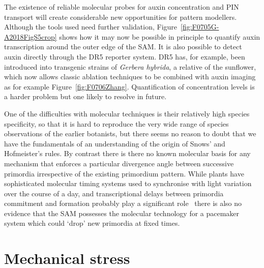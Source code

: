 The existence of reliable molecular probes for auxin concentration and PIN transport will create considerable new opportunities for pattern modellers. Although the tools used need further validation,  Figure~\ref{fig:F0705G-A2018FigS5crop} shows how it may now be possible in principle to quantify auxin transcription around the outer edge of the SAM. 
%
%
%
It is also possible to detect auxin directly through the DR5 reporter system.
 DR5  has, for example, been introduced into transgenic strains of \textit{Gerbera hybrida}, a  relative of the sunflower, which now allows  classic ablation techniques  to be combined with auxin imaging as for example Figure~\ref{fig:F0706Zhang}.
Quantification of concentration levels is a harder problem but one likely to resolve in future. %


One of the difficulties with molecular techniques is their relatively high species specificity, so that it is hard to reproduce the very wide range of species observations of the earlier botanists, but there seems no reason to doubt that we have the fundamentals of an understanding of the origin of Snows' and Hofmeister's rules. By contrast there is there no known molecular basis  for any mechanism that enforces a particular divergence angle between successive primordia irrespective of the existing primordium pattern. While plants have sophisticated molecular timing systems used to synchronise with light variation over the course of a day, and transcriptional  delays between primordia commitment and formation probably play a significant role~\autocite{galvan-ampudiaTemporalIntegrationAuxin2020}
 there is also no evidence that the SAM possesses the molecular technology for a pacemaker system which could `drop' new primordia at fixed times. 

\section{Mechanical stress}


